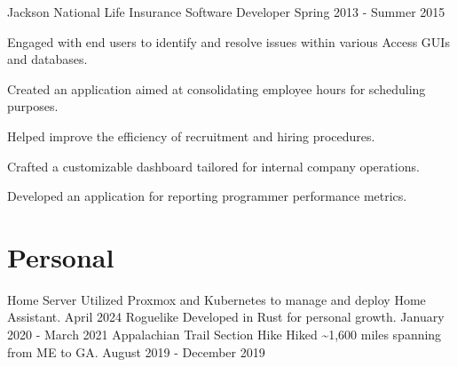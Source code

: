\documentclass{marvinkassabian_resume}
\begin{document}
\subsectionpositiondate
{Jackson National Life Insurance}
{Software Developer}
{Spring 2013 - Summer 2015}
\resumesublistbegin
\item Engaged with end users to identify and resolve issues within various Access GUIs and databases.
\item Created an application aimed at consolidating employee hours for scheduling purposes.
\item Helped improve the efficiency of recruitment and hiring procedures.
\item Crafted a customizable dashboard tailored for internal company operations.
\item Developed an application for reporting programmer performance metrics.
\resumesublistend

\section{Personal}
\subsectionlocationdate
{Home Server}
{Utilized Proxmox and Kubernetes to manage and deploy Home Assistant.}
{April 2024}
\subsectionlocationdate
{Roguelike}
{Developed in Rust for personal growth.}
{January 2020 - March 2021}
\subsectionlocationdate
{Appalachian Trail Section Hike}
{Hiked \~{}1,600 miles spanning from ME to GA.}
{August 2019 - December 2019}
\end{document}
